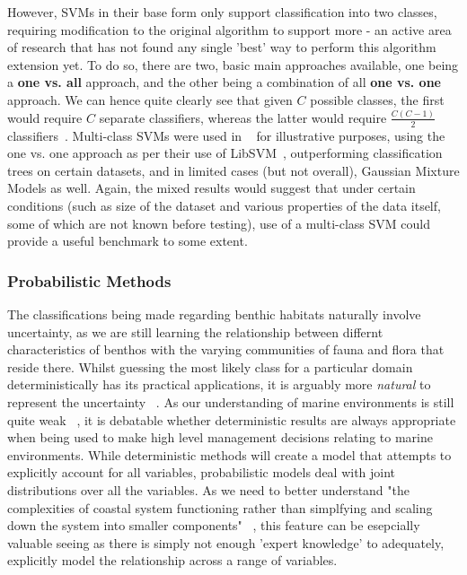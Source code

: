 \documentclass[12pt]{article}
\begin{document}
            However, SVMs in their base form only support classification into two classes, requiring modification to the original algorithm to support more - an active area of research that has not found any single 'best' way to perform this algorithm extension yet. To do so, there are two, basic main approaches available, one being a \textbf{one vs. all} approach, and the other being a combination of all \textbf{one vs. one} approach. We can hence quite clearly see that given $C$ possible classes, the first would require $C$ separate classifiers, whereas the latter would require $\frac{C(C-1)}{2}$ classifiers~\citep{murphy12}. Multi-class SVMs were used in ~\citet{ahsan11} for illustrative purposes, using the one vs. one approach as per their use of LibSVM~\citep{chang11}, outperforming classification trees on certain datasets, and in limited cases (but not overall), Gaussian Mixture Models as well. Again, the mixed results would suggest that under certain conditions (such as size of the dataset and various properties of the data itself, some of which are not known before testing), use of a multi-class SVM could provide a useful benchmark to some extent.

            \subsubsection{Probabilistic Methods}
            The classifications being made regarding benthic habitats naturally involve uncertainty, as we are still learning the relationship between differnt characteristics of benthos with the varying communities of fauna and flora that reside there. Whilst guessing the most likely class for a particular domain deterministically has its practical applications, it is arguably more \textit{natural} to represent the uncertainty ~\citep{rasmussen06}. As our understanding of marine environments is still quite weak ~\citep{un04}, it is debatable whether deterministic results are always appropriate when being used to make high level management decisions relating to marine environments. While deterministic methods will create a model that attempts to explicitly account for all variables, probabilistic models deal with joint distributions over all the variables. As we need to better understand "the complexities of coastal system functioning rather than simplfying and scaling down the system into smaller components" ~\citep{diaz04}, this feature can be esepcially valuable seeing as there is simply not enough 'expert knowledge' to adequately, explicitly model the relationship across a range of variables.
\end{document}
